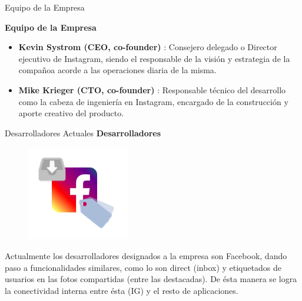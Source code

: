 \begin{frame}[t,fragile]{Equipo de la Empresa}


\textbf{Equipo de la Empresa}
\bigskip

\begin{itemize}
    \item \textbf{Kevin Systrom (CEO, co-founder)} :  Consejero delegado o Director ejecutivo de Instagram, siendo el responsable de la visión y estrategia de la compañoa acorde a las operaciones diaria de la misma.
    \item \textbf{Mike Krieger (CTO, co-founder)} : Responsable técnico del desarrollo como la cabeza de ingeniería en Instagram, encargado de la construcción y aporte creativo del producto.
\end{itemize}
\end{frame}


\begin{frame}[t,fragile]{Desarrolladores Actuales}
\bigskip
\textbf{Desarrolladores}
\bigskip

\begin{figure} 
\vspace{1pt}
  \begin{center}
    \includegraphics[width=0.4\textwidth]{fbig.png}
    \label{fig:databaseUserTable}
  \end{center}
  \vspace{2pt}
\end{figure}

Actualmente los desarrolladores designados a la empresa son Facebook,  dando paso a funcionalidades similares, como lo son direct (inbox) y etiquetados de usuarios en las fotos compartidas (entre las destacadas). De ésta manera se logra la conectividad interna entre ésta (IG) y el resto de aplicaciones.

\end{frame}


